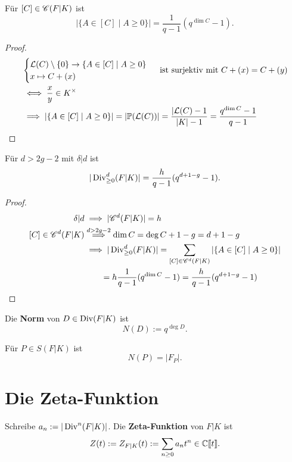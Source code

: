 \begin{lemma}
    Für $[C] \in \Cs(F|K)$ ist
    $$ | \{A \in [C] \mid A \geq 0\}| = \frac{1}{q-1}(q^{\dim C}-1).$$
\end{lemma}
\begin{proof}
    \begin{align*}
        &\begin{cases}
            \mathcal{L}(C)\setminus \{0\} \to \{A \in [C] \mid A \geq 0\}\\
            x \mapsto C + (x)
        \end{cases} \text{ ist surjektiv mit } C + (x) = C + (y)\\
        &\iff \frac{x}{y} \in K^\times\\
        &\implies |\{A \in [C] \mid A \geq 0\}| = |\P(\mathcal{L}(C))| = \frac{|\mathcal{L}(C) - 1}{|K| -1} 
        = \frac{q^{\dim C}-1}{q-1}
    \end{align*}
\end{proof}

\begin{satz}
    Für $d > 2g - 2$ mit $\delta|d$ ist
    $$ |\Div^d_{\geq 0}(F|K)| = \frac{h}{q-1}(q^{d+1-g}-1).$$
\end{satz}
\begin{proof}
    \begin{align*}
        \delta|d & \implies |\Cs^d(F|K)| = h\\
        [C] \in \Cs^d(F|K) & \stackrel{d > 2g - 2}{\implies} \dim C = \deg C + 1 -g = d + 1 -g\\
        & \implies |\Div^d_{\geq 0}(F|K)| = \sum_{[C]\in \Cs^d(F|K)} |\{A \in [C] \mid A \geq 0\}|\\
        & \qquad = h \frac{1}{q-1}(q^{\dim C} -1) = \frac{h}{q-1}(q^{d +1 -g}-1)
    \end{align*}
\end{proof}

\begin{definition}
    Die \textbf{Norm} von $D \in \Div(F|K)$ ist
    $$ N(D) := q^{\deg D}. $$
\end{definition}

\begin{beispiel}
    Für $P \in S(F|K)$ ist
    $$ N(P) = |F_P|.$$
\end{beispiel}

\section{Die Zeta-Funktion}
\begin{definition}
    Schreibe $a_n := |\Div^n(F|K)|$. Die \textbf{Zeta-Funktion} von $F|K$ ist
    $$ Z(t):=Z_{F|K}(t):= \sum_{n \geq 0} a_n t^n \in \C\llbracket t\rrbracket.$$
\end{definition}

